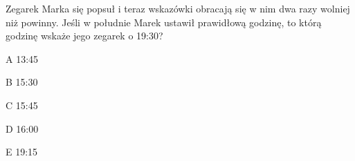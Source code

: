 \begin{tresc}
Zegarek Marka się popsuł i teraz wskazówki obracają się w nim dwa razy wolniej niż powinny. Jeśli w południe Marek ustawił prawidłową godzinę, to którą godzinę wskaże jego zegarek o 19:30?
\end{tresc}
\begin{wariant}{A} 13:45 \end{wariant}
\begin{wariant}{B} 15:30 \end{wariant}
\begin{wariant}{C} 15:45 \end{wariant}
\begin{wariant}{D} 16:00 \end{wariant}
\begin{wariant}{E} 19:15 \end{wariant}
